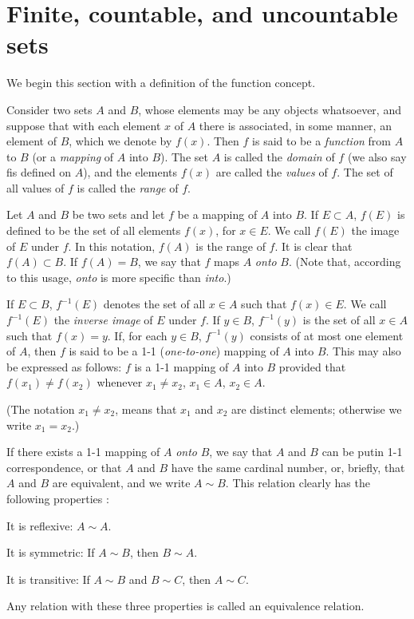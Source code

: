 \section{Finite, countable, and uncountable sets}

We begin this section with a definition of the function concept.
\begin{mydef}
    \label{mydef:2.1}
    Consider two sets $A$ and $B$, whose elements may be any objects whatsoever, and suppose that with each element $x$ of $A$ there is associated, in some manner, an element of $B$, which we denote by $f(x)$. Then $f$ is said to be a \emph{function} from $A$ to $B$ (or a \emph{mapping} of $A$ into $B$). The set $A$ is called the \emph{domain} of $f$ (we also say fis defined on $A$), and the elements $f(x)$ are called the \emph{values} of $f$. The set of all values of $f$ is called the \emph{range} of $f$.
\end{mydef}

\begin{mydef}
    \label{mydef:2.2}
    Let $A$ and $B$ be two sets and let $f$ be a mapping of $A$ into $B$.
    If $E \subset A$, $f(E)$ is defined to be the set of all elements $f(x)$, for $x \in E$. We call $f(E)$ the image of $E$ under $f$. In this notation, $f(A)$ is the range of $f$. It is clear that $f(A) \subset B$. If $f(A) = B$, we say that $f$ maps $A$ \emph{onto} $B$. (Note that, according
    to this usage, \emph{onto} is more specific than \emph{into}.)

    If $E \subset B$, $f^{-1}(E)$ denotes the set of all $x \in A$ such that $f(x)\in E$. We call $f^{-1}(E)$ the \emph{inverse image} of $E$ under $f$. If $y \in B$, $f^{-1}(y)$ is the set of all $x \in A$ such that $f(x) =y$. If, for each $y\in B$, $f^{-1}(y)$ consists of at most one element of $A$, then $f$ is said to be a 1-1 (\emph{one-to-one}) mapping of $A$ into $B$. This may also be expressed as follows: $f$ is a 1-1 mapping of $A$ into $B$ provided that $f(x_1) \neq f(x_2)$ whenever $x_1 \neq x_2$, $x_1 \in A$, $x_2 \in A$.

    (The notation $x_1 \neq x_2$, means that $x_1$ and $x_2$ are distinct elements; otherwise we write $x_1 = x_2$.)
\end{mydef}

\begin{mydef}
    \label{mydef:2.3}
    If there exists a 1-1 mapping of $A$ \emph{onto} $B$, we say that $A$ and $B$ can be putin 1-1 correspondence, or that $A$ and $B$ have the same cardinal number, or, briefly, that $A$ and $B$ are equivalent, and we write $A\sim B$. This relation
    clearly has the following properties :

    It is reflexive: $A\sim A$.

    It is symmetric: If $A\sim B$, then $B\sim A$.

    It is transitive: If $A\sim B$ and $B\sim C$, then $A\sim C$.

    Any relation with these three properties is called an equivalence relation.    
\end{mydef}

